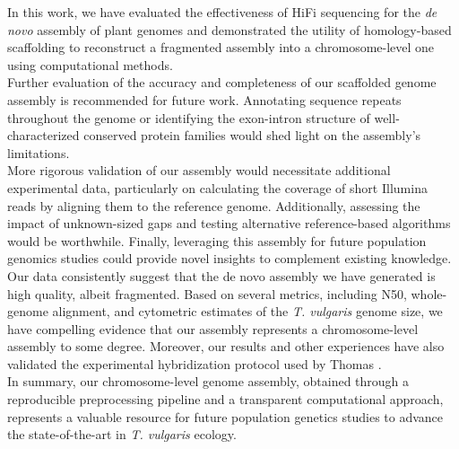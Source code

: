 
In this work, we have evaluated the effectiveness of \ac{HiFi} sequencing for the \textit{de novo} assembly of plant genomes and demonstrated the utility of homology-based scaffolding to reconstruct a fragmented assembly into a chromosome-level one using computational methods. \\


Further evaluation of the accuracy and completeness of our scaffolded genome assembly is recommended for future work. Annotating sequence repeats throughout the genome\cite{flynnRepeatModeler2AutomatedGenomic2019} or identifying the exon-intron structure of well-characterized conserved protein families\cite{parraCEGMAPipelineAccurately2007} would shed light on the assembly's limitations. \\

More rigorous validation of our assembly would necessitate additional experimental data, particularly on calculating the coverage of short Illumina reads by aligning them to the reference genome. Additionally, assessing the impact of unknown-sized gaps and testing alternative reference-based algorithms would be worthwhile. Finally, leveraging this assembly for future population genomics studies could provide novel insights to complement existing knowledge.\\


Our data consistently suggest that the de novo assembly we have generated is high quality, albeit fragmented. Based on several metrics, including N50, whole-genome alignment, and cytometric estimates of the \textit{T. vulgaris} genome size, we have compelling evidence that our assembly represents a chromosome-level assembly to some degree. Moreover, our results and other experiences have also validated the experimental hybridization protocol used by Thomas \etal. \cite{bataillonGenotypePhenotypeGenetic2022}\\

In summary, our chromosome-level genome assembly, obtained through a reproducible preprocessing pipeline and a transparent computational approach, represents a valuable resource for future population genetics studies to advance the state-of-the-art in \textit{T. vulgaris} ecology.\\